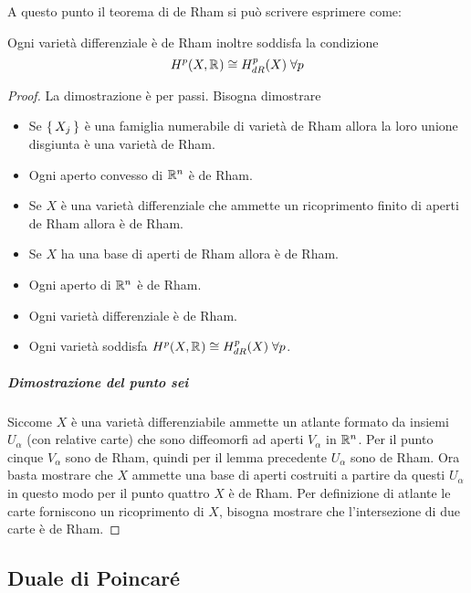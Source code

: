 \eproof
A questo punto il teorema di de Rham si può scrivere esprimere come:
\begin{theorem}
  Ogni varietà differenziale è de Rham inoltre soddisfa la condizione
  \[
    H^p(X, \mathbb{R}^{}) \cong H^p_{dR}(X) \; \forall p
  \]
\end{theorem}
\begin{proof}
  La dimostrazione è per passi. Bisogna dimostrare
  \begin{itemize}
  \item Se $ \set{X_j} $ è una famiglia numerabile di varietà de Rham
    allora la loro unione disgiunta è una varietà de Rham.
  \item Ogni aperto convesso di $ \mathbb{R}^{n} $ è de Rham.
  \item Se $ X $ è una varietà differenziale che ammette un ricoprimento
    finito di aperti de Rham allora è de Rham.
  \item Se $ X $ ha una base di aperti de Rham allora è de Rham.
  \item Ogni aperto di $ \mathbb{R}^{n} $ è de Rham.
  \item Ogni varietà differenziale è de Rham.
  \item Ogni varietà soddisfa $  H^p(X, \mathbb{R}^{}) \cong H^p_{dR}(X) \; \forall p $.
  \end{itemize}

  \subparagraph{Dimostrazione del punto sei} Siccome $ X $ è una varietà
  differenziabile ammette un atlante formato da insiemi $ U_\alpha $ (con relative
  carte) che sono diffeomorfi ad aperti $ V_\alpha $ in $ \mathbb{R}^{n} $. Per il punto
  cinque $ V_\alpha $ sono de Rham, quindi per il lemma precedente $ U_\alpha $ sono
  de Rham. Ora basta mostrare che $ X $ ammette una base di aperti costruiti
  a partire da questi $ U_\alpha $ in questo modo per il punto quattro $ X $ è de
  Rham. Per definizione di atlante le carte forniscono un ricoprimento di $ X $,
  bisogna mostrare che l'intersezione di due carte è de Rham.
\end{proof}

\subsection{Duale di Poincaré}


